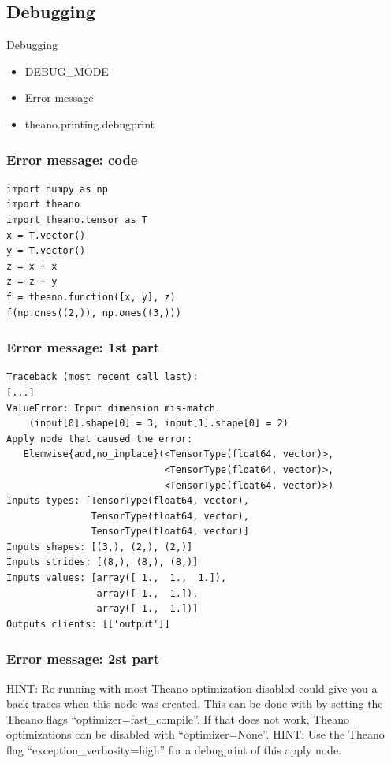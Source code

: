 \documentclass[utf8x,xcolor=pdftex,dvipsnames,table]{beamer}
\begin{document}
\subsection{Debugging}
\begin{frame}{Debugging}
  \begin{itemize}
  \item DEBUG\_MODE
  \item Error message
  \item theano.printing.debugprint
  \end{itemize}
\end{frame}

\begin{frame}[fragile]
  \frametitle{Error message: code}
\begin{lstlisting}
import numpy as np
import theano
import theano.tensor as T
x = T.vector()
y = T.vector()
z = x + x
z = z + y
f = theano.function([x, y], z)
f(np.ones((2,)), np.ones((3,)))
\end{lstlisting}
\end{frame}

\begin{frame}[fragile]
  \frametitle{Error message: 1st part}

\begin{lstlisting}
Traceback (most recent call last):
[...]
ValueError: Input dimension mis-match.
    (input[0].shape[0] = 3, input[1].shape[0] = 2)
Apply node that caused the error:
   Elemwise{add,no_inplace}(<TensorType(float64, vector)>,
                            <TensorType(float64, vector)>,
                            <TensorType(float64, vector)>)
Inputs types: [TensorType(float64, vector),
               TensorType(float64, vector),
               TensorType(float64, vector)]
Inputs shapes: [(3,), (2,), (2,)]
Inputs strides: [(8,), (8,), (8,)]
Inputs values: [array([ 1.,  1.,  1.]),
                array([ 1.,  1.]),
                array([ 1.,  1.])]
Outputs clients: [['output']]
\end{lstlisting}
\end{frame}

\begin{frame}[fragile]
  \frametitle{Error message: 2st part}
HINT: Re-running with most Theano optimization
disabled could give you a back-traces when this
node was created. This can be done with by setting
the Theano flags ``optimizer=fast\_compile''. If that does not
work, Theano optimizations can be disabled with
``optimizer=None''.\newline
HINT: Use the Theano flag ``exception\_verbosity=high''
for a debugprint of this apply node.
\end{frame}
\end{document}
